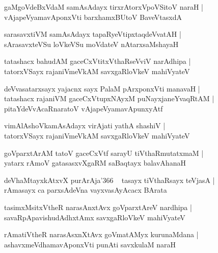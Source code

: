 \documentclass[twoside,12pt,openright]{book}
\newcounter{shloka}[chapter]
\begin{document}
\begin{shloka}
gaMgoVdeBxVdaM samAsAdayx tirxrAtorxVpoVSitoV naraH |\\
vAjapeVyamavAponxVti barxhamxBUtoV BaveVtasxdA
\end{shloka}

\begin{shloka}
sarasavxtiVM samAsAdayx tapaRyeVtipxtaqdeVvatAH |\\
sArasavxteVSu loVkeVSu moVdateV nAtarxsaMshayaH 
\end{shloka}

\begin{shloka}
tatashacx bahudAM gaceCxVtitxVthaRseVviV narAdhipa |\\
tatorxVSayx rajaniVmeVkAM savxgaRloVkeV mahiVyateV 
\end{shloka}

\begin{shloka}
deVvasatarxsayx yajacnx sayx PalaM pArxponxVti manavaH |\\
tatashacx rajaniVM gaceCxVtupxNAyxM puNayxjaneYvaqRtAM |\\
pitaYdeVvAcaRnaratoV vAjapeVyamavApunxyAtf 
\end{shloka}

\begin{shloka}
vimAlAshoVkamAsAdayx virAjati yathA shashiV |\\
tatorxVSayx rajaniVmeVkAM savxgaRloVkeV mahiVyateV
\end{shloka}

\begin{shloka}
goVparxtArAM tatoV gaceCxVtf sarayU tiVthaRmutatxmaM |\\
yatarx rAmoV gatasasxvXgaRM saBaqtayx balavAhanaH 
\end{shloka}

\begin{shloka}
deVhaMtayxkAtxvX purArAja\char'366 ~ tasayx tiVthaRsayx teVjasA |\\
rAmasayx ca parxsAdeVna vayxvasAyAcacx BArata
\end{shloka}

\begin{shloka}
tasimxMsitxVtheR narasAnxtAvx goVparxtAreV nardhipa |\\
savaRpApavishudAdhxtAmx savxgaRloVkeV mahiVyateV 
\end{shloka}

\begin{shloka}
rAmatiVtheR narasAsxnXtAvx goVmatAMyx kurunaMdana |\\
ashavxmeVdhamavAponxVti punAti savxkulaM naraH 
\end{shloka}
\end{document}
